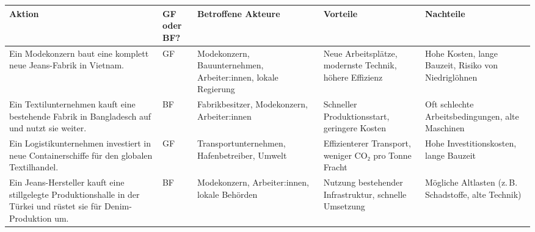 \begin{myexercise}
\begin{myanswer}
\begin{table}[H]
\centering
\footnotesize
\begin{tabular}{p{3cm}||p{1cm}|p{2.7cm}|p{2.7cm}|p{3cm}}
\textbf{Aktion} & \textbf{GF oder BF?} & \textbf{Betroffene Akteure} & \textbf{Vorteile} & \textbf{Nachteile} \\
\midrule\midrule
Ein Modekonzern baut eine komplett neue Jeans-Fabrik in Vietnam. & GF & Modekonzern, Bauunternehmen, Arbeiter:innen, lokale Regierung & Neue Arbeitsplätze, modernste Technik, höhere Effizienz & Hohe Kosten, lange Bauzeit, Risiko von Niedriglöhnen \\\midrule
Ein Textilunternehmen kauft eine bestehende Fabrik in Bangladesch auf und nutzt sie weiter. & BF & Fabrikbesitzer, Modekonzern, Arbeiter:innen & Schneller Produktionsstart, geringere Kosten & Oft schlechte Arbeitsbedingungen, alte Maschinen \\\midrule
Ein Logistikunternehmen investiert in neue Containerschiffe für den globalen Textilhandel. & GF & Transportunternehmen, Hafenbetreiber, Umwelt & Effizienterer Transport, weniger CO₂ pro Tonne Fracht & Hohe Investitionskosten, lange Bauzeit \\\midrule
Ein Jeans-Hersteller kauft eine stillgelegte Produktionshalle in der Türkei und rüstet sie für Denim-Produktion um. & BF & Modekonzern, Arbeiter:innen, lokale Behörden & Nutzung bestehender Infrastruktur, schnelle Umsetzung & Mögliche Altlasten (z. B. Schadstoffe, alte Technik) \\%
\end{tabular}
\end{table}

\end{myanswer}
\end{myexercise}

